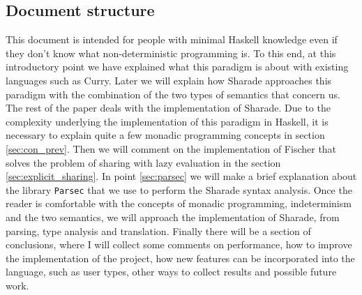 \documentclass[class=article, crop=false]{standalone}
\begin{document}
\subsection{Document structure}
This document is intended for people with minimal Haskell knowledge even if they don't know
what non-deterministic programming is. To this end, at this introductory point we have
explained what this paradigm is about with existing languages such as Curry. Later we will
explain how Sharade approaches this paradigm with the combination of the two types of
semantics that concern us. The rest of the paper deals with the implementation of Sharade.
Due to the complexity underlying the implementation of this paradigm in Haskell, it is
necessary to explain quite a few monadic programming concepts in section \ref{sec:con_prev}.
Then we will comment on the implementation of Fischer that solves the problem of sharing with
lazy evaluation in the section \ref{sec:explicit_sharing}. In point \ref{sec:parsec} we will
make a brief explanation about the library \verb`Parsec` that we use to perform the Sharade
syntax analysis. Once the reader is comfortable with the concepts of monadic programming,
indeterminism and the two semantics, we will approach the implementation of Sharade, from
parsing, type analysis and translation. Finally there will be a section of conclusions, where
I will collect some comments on performance, how to improve the implementation of the
project, how new features can be incorporated into the language, such as user types, other
ways to collect results and possible future work.
\end{document}
